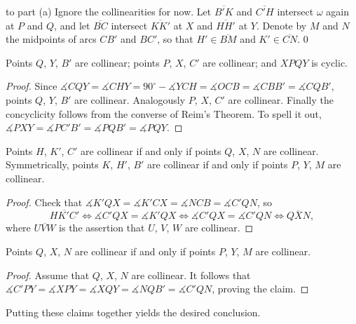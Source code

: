 \begin{customsol}{to part (a)}
    Ignore the collinearities for now. Let $\overline{B'K}$ and $\overline{C'H}$ intersect $\omega$ again at $P$ and $Q$, and let $\overline{BC}$ intersect $\overline{KK'}$ at $X$ and $\overline{HH'}$ at $Y$. Denote by $M$ and $N$ the midpoints of arcs $CB'$ and $BC'$, so that $H'\in\overline{BM}$ and $K'\in\overline{CN}$.
    \setcounter{iclaim}0
    \begin{iclaim}
        Points $Q$, $Y$, $B'$ are collinear; points $P$, $X$, $C'$ are collinear; and $XPQY$ is cyclic.
    \end{iclaim}
    \begin{proof}
        Since $\measuredangle CQY=\measuredangle CHY=90^{\circ}-\measuredangle YCH=\measuredangle OCB=\measuredangle CBB'=\measuredangle CQB'$, points $Q$, $Y$, $B'$ are collinear. Analogously $P$, $X$, $C'$ are collinear. Finally the concyclicity follows from the converse of Reim's Theorem. To spell it out, $\measuredangle PXY=\measuredangle PC'B'=\measuredangle PQB'=\measuredangle PQY$.
    \end{proof}
    \begin{iclaim}
        Points $H$, $K'$, $C'$ are collinear if and only if points $Q$, $X$, $N$ are collinear. Symmetrically, points $K$, $H'$, $B'$ are collinear if and only if points $P$, $Y$, $M$ are collinear.
    \end{iclaim}
    \begin{proof}
        Check that $\measuredangle K'QX=\measuredangle K'CX=\measuredangle NCB=\measuredangle C'QN$, so \[\overline{HK'C'}\iff\measuredangle C'QX=\measuredangle K'QX\iff\measuredangle C'QX=\measuredangle C'QN\iff\overline{QXN},\]
        where $\overline{UVW}$ is the assertion that $U$, $V$, $W$ are collinear.
    \end{proof}
    \begin{iclaim}
        Points $Q$, $X$, $N$ are collinear if and only if points $P$, $Y$, $M$ are collinear.
    \end{iclaim}
    \begin{proof}
        Assume that $Q$, $X$, $N$ are collinear. It follows that $\measuredangle C'PY=\measuredangle XPY=\measuredangle XQY=\measuredangle NQB'=\measuredangle C'QN$, proving the claim.
    \end{proof}

    Putting these claims together yields the desired conclusion.
\end{customsol}
